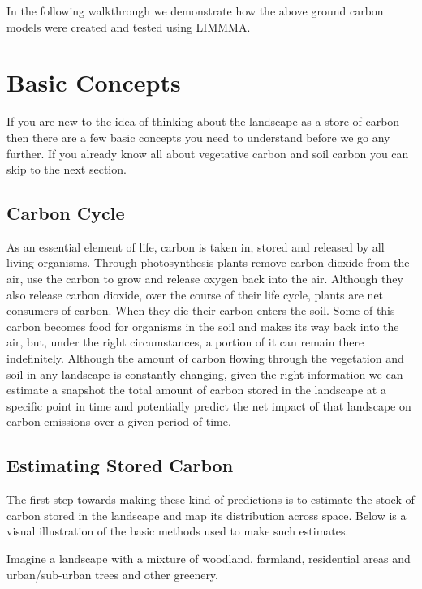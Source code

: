 \documentclass[
  letterpaper,
  DIV=11,
  numbers=noendperiod]{scrreprt}
\begin{document}
In the following walkthrough we demonstrate how the above ground carbon
models were created and tested using LIMMMA.

\section{Basic Concepts}\label{basic-concepts}

If you are new to the idea of thinking about the landscape as a store of
carbon then there are a few basic concepts you need to understand before
we go any further. If you already know all about vegetative carbon and
soil carbon you can skip to the next section.

\subsection{Carbon Cycle}\label{carbon-cycle}

As an essential element of life, carbon is taken in, stored and released
by all living organisms. Through photosynthesis plants remove carbon
dioxide from the air, use the carbon to grow and release oxygen back
into the air. Although they also release carbon dioxide, over the course
of their life cycle, plants are net consumers of carbon. When they die
their carbon enters the soil. Some of this carbon becomes food for
organisms in the soil and makes its way back into the air, but, under
the right circumstances, a portion of it can remain there indefinitely.
Although the amount of carbon flowing through the vegetation and soil in
any landscape is constantly changing, given the right information we can
estimate a snapshot the total amount of carbon stored in the landscape
at a specific point in time and potentially predict the net impact of
that landscape on carbon emissions over a given period of time.

\subsection{Estimating Stored Carbon}\label{estimating-stored-carbon}

The first step towards making these kind of predictions is to estimate
the stock of carbon stored in the landscape and map its distribution
across space. Below is a visual illustration of the basic methods used
to make such estimates.

Imagine a landscape with a mixture of woodland, farmland, residential
areas and urban/sub-urban trees and other greenery.
\end{document}
